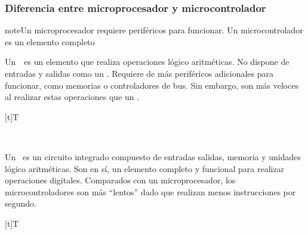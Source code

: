 \documentclass[letterpaper,10pt,spanish]{sphinxmanual}
\let\sphinxpxdimen\pdfpxdimen\else\newdimen\sphinxpxdimen
\begin{document}
\subsubsection{Diferencia entre microprocesador y microcontrolador}
\label{\detokenize{1_guias/10informatica/G1004:diferencia-entre-microprocesador-y-microcontrolador}}
\begin{sphinxadmonition}{note}{Un micro\sphinxhyphen{}procesador requiere periféricos para funcionar. Un micro\sphinxhyphen{}controlador es un elemento completo}

\sphinxAtStartPar
Un  es un elemento que realiza operaciones lógico aritméticas. No dispone de entradas y salidas como un . Requiere de más periféricos adicionales para funcionar, como memorias o controladores de bus. Sin embargo, son más veloces al realizar estas operaciones que un .


\begin{savenotes}\sphinxattablestart
\sphinxthistablewithglobalstyle
\centering
\begin{tabulary}{\linewidth}[t]{T}
\sphinxtoprule
\sphinxtableatstartofbodyhook

\begin{sphinxfigure-in-table}
\centering
\capstart
\noindent\sphinxincludegraphics[width=320\sphinxpxdimen]{{image042}.png}
\label{\detokenize{1_guias/10informatica/G1004:id6}}\end{sphinxfigure-in-table}\relax
\\
\sphinxbottomrule
\end{tabulary}
\sphinxtableafterendhook\par
\sphinxattableend\end{savenotes}

\sphinxAtStartPar
Un  es un circuito integrado compuesto de entradas salidas, memoria y unidades lógico aritméticas. Son en sí, un elemento completo y funcional para realizar operaciones digitales. Comparados con un micro\sphinxhyphen{}procesador, los micro\sphinxhyphen{}controladores son más “lentos” dado que realizan menos instrucciones por segundo.


\begin{savenotes}\sphinxattablestart
\sphinxthistablewithglobalstyle
\centering
\begin{tabulary}{\linewidth}[t]{T}
\sphinxtoprule
\sphinxtableatstartofbodyhook

\begin{sphinxfigure-in-table}
\centering
\capstart
\noindent\sphinxincludegraphics[width=300\sphinxpxdimen]{{image062}.png}
\label{\detokenize{1_guias/10informatica/G1004:id7}}\end{sphinxfigure-in-table}\relax
\\
\sphinxbottomrule
\end{tabulary}
\sphinxtableafterendhook\par
\sphinxattableend\end{savenotes}
\end{sphinxadmonition}
\end{document}
